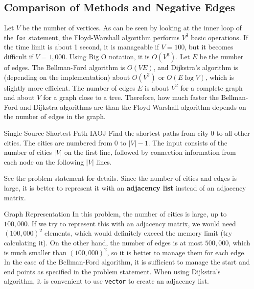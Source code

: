 \subsection{Comparison of Methods and Negative Edges}
Let $V$ be the number of vertices.
As can be seen by looking at the inner loop of the \texttt{for} statement, the Floyd-Warshall algorithm performs $V^3$ basic operations.
If the time limit is about 1 second,
it is manageable if $V=100$, but it becomes difficult if $V=1,000$.
Using Big O notation, it is $O(V^3)$. Let $E$ be the number of edges.
The Bellman-Ford algorithm is $O(VE)$, and Dijkstra's algorithm is (depending on the implementation)
about $O(V^2)$ or $O(E \log V)$, which is slightly more efficient. The number of edges $E$ is about $V^2$ for a complete graph and about $V$ for a graph close to a tree. Therefore, how much faster the Bellman-Ford and Dijkstra algorithms are than the Floyd-Warshall algorithm depends on the number of edges in the graph.

\begin{psbox}{Single Source Shortest Path I}{AOJ}
Find the shortest paths from city $0$ to all other cities. The cities are numbered from $0$ to $|V|-1$. The input consists of the number of cities $|V|$ on the first line, followed by connection information from each node on the following $|V|$ lines.

See the problem statement for details.
Since the number of cities and edges is large, it is better to represent it with an \textbf{adjacency list} instead of an adjacency matrix.

\end{psbox}

\begin{tipsbox}{Graph Representation}
  In this problem, the number of cities is large, up to $100,000$. If we try to represent this with an adjacency matrix,
  we would need $(100,000)^2$ elements, which would definitely exceed the memory limit (try calculating it).
  On the other hand, the number of edges is at most $500,000$, which is much smaller than $(100,000)^2$, so it is better to manage them for each edge.
  In the case of the Bellman-Ford algorithm, it is sufficient to manage the start and end points as specified in the problem statement.
  When using Dijkstra's algorithm, it is convenient to use \texttt{vector} to create an adjacency list.
\end{tipsbox}

